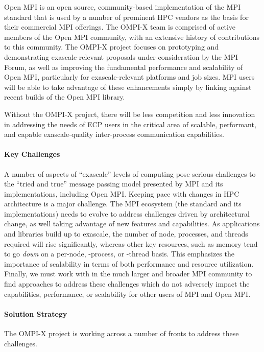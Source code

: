 Open MPI is an open source, community-based implementation of the MPI
standard that is
used by a number of prominent
HPC vendors as the basis for their commercial MPI offerings.  The
OMPI-X team is comprised of active members of the Open MPI community,
with an extensive history of contributions to this community.
The OMPI-X project focuses on prototyping
and demonstrating exascale-relevant proposals under consideration by
the MPI Forum, as well as improving the fundamental performance and
scalability of Open MPI, particularly for exascale-relevant platforms
and job sizes.  MPI users will be able to take advantage of these
enhancements simply by linking against recent builds of the Open MPI
library.

Without the OMPI-X project, there will be less competition and less
innovation in addressing the needs of ECP users in the critical area
of scalable, performant, and capable exascale-quality inter-process
communication capabilities.

\paragraph{Key  Challenges}
A number of aspects of ``exascale'' levels
of computing pose serious challenges to the ``tried and true'' message
passing model presented by MPI and its implementations, including Open
MPI.
%
Keeping pace with changes in HPC architecture is a major challenge.
The MPI ecosystem (the standard and its implementations) needs to
evolve to address challenges
driven by
architectural change, as well taking advantage of new features and
capabilities.
%
As applications and libraries
build up to exascale,
the number of node, processes, and
threads required will rise significantly, whereas other key resources,
such as memory tend to go \emph{down} on a per-node, -process, or
-thread basis.  This emphasizes the importance of scalability in terms
of both performance and resource utilization.
%
Finally, we must work with in the much larger and broader MPI
community to find approaches to address these challenges which do not
adversely impact the capabilities, performance, or scalability for
other users of MPI and Open MPI.

\paragraph{Solution Strategy}
The OMPI-X project is working across a number of fronts to address
these challenges.

